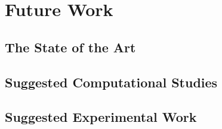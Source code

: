 \chapter{Future Work}
\label{chap-ten}

\section{The State of the Art}

\section{Suggested Computational Studies}


\section{Suggested Experimental Work}




